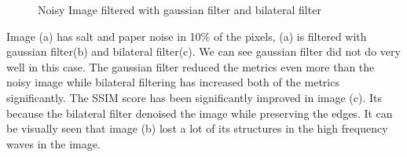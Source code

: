 \documentclass[a4paper, english]{article}
\begin{document}
\begin{figure}[H]
\centering
    \caption{Noisy Image filtered with gaussian filter and bilateral filter}
\end{figure}

Image (a) has salt and paper noise in 10\% of the pixels, (a) is filtered with gaussian filter(b) and bilateral filter(c). We can see gaussian filter did not do very well in this case. The gaussian filter reduced the metrics even more than the noisy image while bilateral filtering has increased both of the metrics significantly. The SSIM score has been significantly improved in image (c). Its because the bilateral filter denoised the image while preserving the edges. It can be visually seen that image (b) lost a lot of its structures in the high frequency waves in the image.
\end{document}
